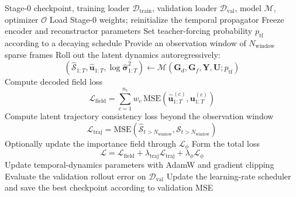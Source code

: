 \begin{algorithm}[htbp]
\caption{Stage-1 latent forecasting training (release protocol)}
\label{alg:stage1_train}
\begin{algorithmic}[1]
\Require Stage-0 checkpoint, training loader $\mathcal{D}_{\mathrm{train}}$, validation loader $\mathcal{D}_{\mathrm{val}}$, model $\mathcal{M}$, optimizer $\mathcal{O}$
\State Load Stage-0 weights; reinitialize the temporal propagator
\State Freeze encoder and reconstructor parameters
    \State Set teacher-forcing probability $p_{\mathrm{tf}}$ according to a decaying schedule
        \State Provide an observation window of $N_{\mathrm{window}}$ sparse frames
        \State Roll out the latent dynamics autoregressively:
        \[
            (\hat{\mathcal{S}}_{1:T}, \hat{\mathbf{u}}_{1:T}, \log \hat{\boldsymbol{\sigma}}^2_{1:T}) \leftarrow \mathcal{M}(\mathbf{G}_d,\mathbf{G}_f,\mathbf{Y},\mathbf{U}; p_{\mathrm{tf}})
        \]
        \State Compute decoded field loss
        \[
            \mathcal{L}_{\mathrm{field}} = \sum_{c=1}^{n_c} w_c\,\mathrm{MSE}(\hat{\mathbf{u}}_{1:T}^{(c)},\mathbf{u}_{1:T}^{(c)})
        \]
        \State Compute latent trajectory consistency loss beyond the observation window
        \[
            \mathcal{L}_{\mathrm{traj}} = \mathrm{MSE}(\hat{\mathcal{S}}_{t>N_{\mathrm{window}}}, \mathcal{S}_{t>N_{\mathrm{window}}})
        \]
        \State Optionally update the importance field through $\mathcal{L}_{\phi}$
        \State Form the total loss
        \[
            \mathcal{L} = \mathcal{L}_{\mathrm{field}} + \lambda_{\mathrm{traj}}\mathcal{L}_{\mathrm{traj}} + \lambda_{\phi}\mathcal{L}_{\phi}
        \]
        \State Update temporal-dynamics parameters with AdamW and gradient clipping
    \EndFor
    \State Evaluate the validation rollout error on $\mathcal{D}_{\mathrm{val}}$
    \State Update the learning-rate scheduler and save the best checkpoint according to validation MSE
\EndFor
\end{algorithmic}
\end{algorithm}
